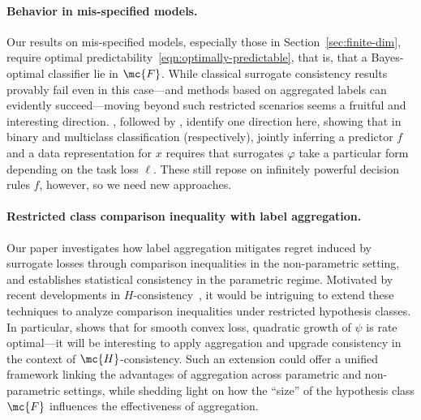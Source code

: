 \documentclass[11pt]{article}
\newcommand{\tloss}{\ell}  %
\newcommand{\sloss}{\varphi}  %
\begin{document}
\paragraph{Behavior in mis-specified models.}
Our results on mis-specified models, especially those in
Section~\ref{sec:finite-dim}, require optimal
predictability~\eqref{eqn:optimally-predictable}, that is, that a
Bayes-optimal classifier lie in $\mc{F}$.
%
While classical surrogate consistency results provably fail even in this
case---and methods based on aggregated labels can evidently succeed---moving
beyond such restricted scenarios seems a fruitful and interesting direction.
%
\citet{NguyenWaJo09}, followed by \citet{DuchiKhRu16}, identify one
direction here, showing that in binary and multiclass classification
(respectively), jointly inferring a predictor $f$ and a data representation
for $x$ requires that surrogates $\sloss$ take a particular form depending
on the task loss $\tloss$.
%
These still repose on infinitely powerful decision rules $f$, however,
so we need new approaches.

\paragraph{Restricted class comparison inequality with label aggregation.}
Our paper investigates how label aggregation mitigates regret induced by surrogate losses
through comparison inequalities in the non-parametric setting, and establishes statistical consistency in the parametric regime. Motivated by recent developments in $H$-consistency~\citep{AwasthiMaMoZh22, MaoMoZh24, MaoMoZh24b, MaoMoZh25}, it would be intriguing to extend these techniques to analyze comparison inequalities under restricted hypothesis classes. In particular, \citet{MaoMoZh24b} shows that for smooth convex loss, quadratic growth of $\psi$ is rate optimal---it will be interesting to apply aggregation
and upgrade consistency in the context of $\mc{H}$-consistency. Such an extension could offer a unified framework linking the advantages of aggregation across parametric and non-parametric settings, while shedding light on how the ``size'' of the hypothesis class 
$\mc{F}$ influences the effectiveness of aggregation.

\end{document}
